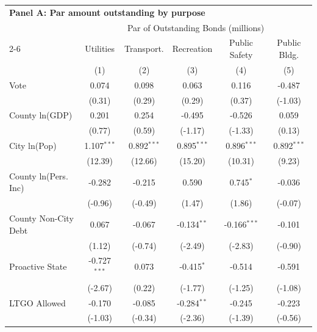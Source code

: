 \begingroup
\centering
\begin{tabular*}{\textwidth}{@{\extracolsep{\fill}}lccccc}
\multicolumn{6}{l}{\textbf{Panel A: Par amount outstanding by purpose}}\\

\addlinespace
   \toprule
    & \multicolumn{5}{c}{Par of Outstanding Bonds (millions)}\\
   \cmidrule(lr){2-6}
                        & Utilities      & Transport.    & Recreation    & Public Safety  & Public Bldg. \\   
                        & (1)            & (2)           & (3)           & (4)            & (5)\\  
   \midrule 
   Vote                 & 0.074          & 0.098         & 0.063         & 0.116          & -0.487\\   
                        & (0.31)        & (0.29)       & (0.29)       & (0.37)        & (-1.03)\\   
   County ln(GDP)       & 0.201          & 0.254         & -0.495        & -0.526         & 0.059\\   
                        & (0.77)        & (0.59)       & (-1.17)      & (-1.33)       & (0.13)\\   
   City ln(Pop)         & 1.107$^{***}$  & 0.892$^{***}$ & 0.895$^{***}$ & 0.896$^{***}$  & 0.892$^{***}$\\   
                        & (12.39)       & (12.66)      & (15.20)      & (10.31)       & (9.23)\\   
   County ln(Pers. Inc) & -0.282         & -0.215        & 0.590         & 0.745$^{*}$    & -0.036\\   
                        & (-0.96)       & (-0.49)      & (1.47)       & (1.86)        & (-0.07)\\   
   County Non-City Debt & 0.067          & -0.067        & -0.134$^{**}$ & -0.166$^{***}$ & -0.101\\   
                        & (1.12)        & (-0.74)      & (-2.49)      & (-2.83)       & (-0.90)\\   
   Proactive State      & -0.727$^{***}$ & 0.073         & -0.415$^{*}$  & -0.514         & -0.591\\   
                        & (-2.67)       & (0.22)       & (-1.77)      & (-1.25)       & (-1.08)\\   
   LTGO Allowed         & -0.170         & -0.085        & -0.284$^{**}$ & -0.245         & -0.223\\   
                        & (-1.03)       & (-0.34)      & (-2.36)      & (-1.39)       & (-0.56)\\   

\end{tabular*}
